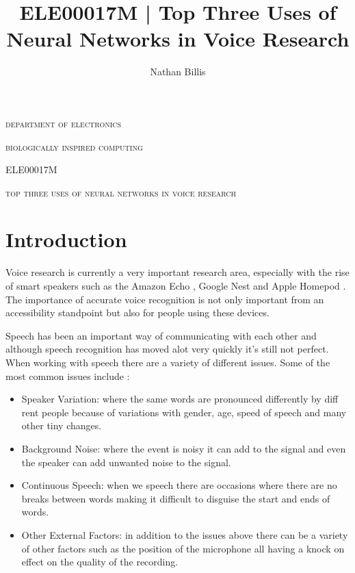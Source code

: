 \documentclass[11pt]{article}
\title{ 
    ELE00017M | Top Three Uses of Neural Networks in Voice Research
}
\author{Nathan Billis}
\begin{document}
\begin{titlepage}
    \centering
    {\scshape\LARGE department of electronics \par}
    \vspace{0.5cm}
    {\scshape\Large biologically inspired computing \par}
    \vspace{0.5cm}
    {\scshape\Large ELE00017M \par}
    \vspace{2.5cm}
    {\scshape\Large top three uses of neural networks in voice research \par}
    \vfill
    {\Large\itshape \@author \par}
    \vspace{2cm}
    
    \tableofcontents

\end{titlepage}

	
\newpage

    \section{Introduction}
    
    Voice research is currently a very important research area, especially with the rise of smart speakers such as the Amazon Echo \cite{IntroducingRoom}, Google Nest \cite{GoogleStore} and Apple Homepod \cite{HomePodUK}. The importance of accurate voice recognition is not only important from an accessibility standpoint but also for people using these devices. 
    
    Speech has been an important way of communicating with each other and although speech recognition has moved alot very quickly it's still not perfect. When working with speech there are a variety of different issues. Some of the most common issues include \cite{Gevaert2010NeuralRecognition}: 
    \begin{itemize}
        \item Speaker Variation: where the same words are pronounced differently by diff rent people because of variations with gender, age, speed of speech and many other tiny changes.
        \item Background Noise: where the event is noisy it can add to the signal and even the speaker can add unwanted noise to the signal.
        \item Continuous Speech: when we speech there are occasions where there are no breaks between words making it difficult to disguise the start and ends of words.
        \item Other External Factors: in addition to the issues above there can be a variety of other factors such as the position of the microphone all having a knock on effect on the quality of the recording.
    \end{itemize}
    
\end{document}
